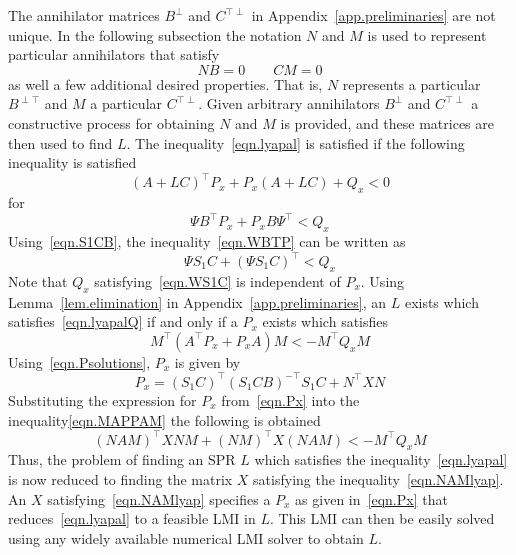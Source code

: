 The annihilator matrices $B^{\perp}$ and $C^{\top\perp}$ in Appendix~\ref{app.preliminaries} are not unique.
In the following subsection the notation $N$ and $M$ is used to represent particular annihilators that satisfy
\begin{equation}
  \label{eqn.NB0CM0}
  NB=0
  \qquad
  CM=0
\end{equation}
as well a few additional desired properties.
That is, $N$ represents a particular $B^{\perp\top}$ and $M$ a particular $C^{\top\perp}$.
Given arbitrary annihilators $B^{\perp}$ and $C^{\top\perp}$ a constructive process for obtaining $N$ and $M$ is provided, and these matrices are then used to find $L$.
The inequality\ \eqref{eqn.lyapal} is satisfied if the following inequality is satisfied
\begin{equation}
  \label{eqn.lyapalQ}
  (A+LC)^{\top}P_{x}+P_{x}(A+LC)+Q_{x}<0
\end{equation}
for
\begin{equation}
  \label{eqn.WBTP}
  \Psi B^{\top}P_{x}+P_{x}B\Psi^{\top}<Q_{x}
\end{equation}
Using\ \eqref{eqn.S1CB}, the inequality\ \eqref{eqn.WBTP} can be written as
\begin{equation}
  \label{eqn.WS1C}
  \Psi S_{1}C+(\Psi S_{1}C)^{\top}<Q_{x}
\end{equation}
Note that $Q_{x}$ satisfying\ \eqref{eqn.WS1C} is independent of $P_{x}$.
Using Lemma~\ref{lem.elimination} in Appendix~\ref{app.preliminaries}, an $L$ exists which satisfies\ \eqref{eqn.lyapalQ} if and only if a $P_{x}$ exists which satisfies
\begin{equation}
  \label{eqn.MAPPAM}
  M^{\top}(A^{\top}P_{x}+P_{x}A)M<-M^{\top}Q_{x}M
\end{equation}
Using\ \eqref{eqn.Psolutions}, $P_{x}$ is given by
\begin{equation}
  \label{eqn.Px}
  P_{x} = (S_{1}C)^{\top}(S_{1}CB)^{-\top}S_{1}C+N^{\top}XN
\end{equation}
Substituting the expression for $P_{x}$ from\ \eqref{eqn.Px} into the inequality\eqref{eqn.MAPPAM} the following is obtained
\begin{equation}
  \label{eqn.NAMlyap}
  (NAM)^{\top}XNM+(NM)^{\top}X(NAM)<-M^{\top}Q_{x}M
\end{equation}
Thus, the problem of finding an SPR $L$ which satisfies the inequality\ \eqref{eqn.lyapal} is now reduced to finding the matrix $X$ satisfying the inequality\ \eqref{eqn.NAMlyap}.
An $X$ satisfying\ \eqref{eqn.NAMlyap} specifies a $P_{x}$ as given in\ \eqref{eqn.Px} that reduces\ \eqref{eqn.lyapal} to a feasible LMI in $L$.
This LMI can then be easily solved using any widely available numerical LMI solver to obtain $L$.

